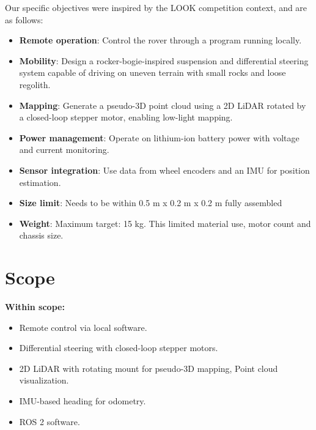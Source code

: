 Our specific objectives were inspired by the LOOK competition context, and are as follows:
\begin{itemize}
    \item \textbf{Remote operation}: Control the rover through a program running locally.
    \item \textbf{Mobility}: Design a rocker-bogie-inspired suspension and differential steering system capable of driving on uneven terrain with small rocks and loose regolith.
    \item \textbf{Mapping}: Generate a pseudo-3D point cloud using a 2D LiDAR rotated by a closed-loop stepper motor, enabling low-light mapping.
    \item \textbf{Power management}: Operate on lithium-ion battery power with voltage and current monitoring.
    \item \textbf{Sensor integration}: Use data from wheel encoders and an IMU for position estimation.
    \item \textbf{Size limit}: Needs to be within 0.5 m x 0.2 m x 0.2 m fully assembled
    \item \textbf{Weight}: Maximum target: 15 kg. This limited material use, motor count and chassis size.
\end{itemize}

\section{Scope}
\textbf{Within scope:}
\begin{itemize}
    \item Remote control via local software.
    \item Differential steering with closed-loop stepper motors.
    \item 2D LiDAR with rotating mount for pseudo-3D mapping, Point cloud visualization.
    \item IMU-based heading for odometry.
    \item ROS 2 software.
\end{itemize}
